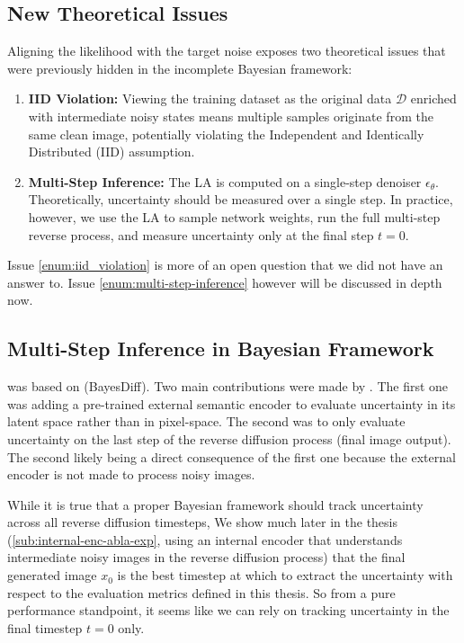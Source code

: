 \subsection{New Theoretical Issues}

Aligning the likelihood with the target noise exposes two theoretical issues that were previously hidden in the incomplete \cite{jazbec_generative_2025} Bayesian framework:

\begin{enumerate}
    \item \textbf{IID Violation:} Viewing the training dataset as the original data $\mathcal{D}$ enriched with intermediate noisy states means multiple samples originate from the same clean image, potentially violating the Independent and Identically Distributed (\acs{IID}) assumption. \label{enum:iid_violation}
    \item \textbf{Multi-Step Inference:} The \acs{LA} is computed on a single-step denoiser $\epsilon_\theta$. Theoretically, uncertainty should be measured over a single step. In practice, however, we use the \acs{LA} to sample network weights, run the full multi-step reverse process, and measure uncertainty only at the final step $t=0$. \label{enum:multi-step-inference}
\end{enumerate}

Issue \ref{enum:iid_violation} is more of an open question that we did not have an answer to. 
Issue \ref{enum:multi-step-inference} however will be discussed in depth now.

\subsection{Multi-Step Inference in Bayesian Framework}
\label{sub:gu_theory_issue_multi_step}

\cite{jazbec_generative_2025} was based on \cite{kou_bayesdiff_2024} (BayesDiff). Two main contributions were made by \cite{jazbec_generative_2025}. The first one was adding a pre-trained external semantic encoder to evaluate uncertainty in its latent space rather than in pixel-space. The second was to only evaluate uncertainty on the last step of the reverse diffusion process (final image output). The second likely being a direct consequence of the first one because the external encoder is not made to process noisy images.

While it is true that a proper Bayesian framework should track uncertainty across all reverse diffusion timesteps, We show much later in the thesis (\autoref{sub:internal-enc-abla-exp}, using an internal encoder that understands intermediate noisy images in the reverse diffusion process) that the final generated image $x_0$ is the best timestep at which to extract the uncertainty with respect to the evaluation metrics defined in this thesis. 
So from a pure performance standpoint, it seems like we can rely on tracking uncertainty in the final timestep $t=0$ only.

